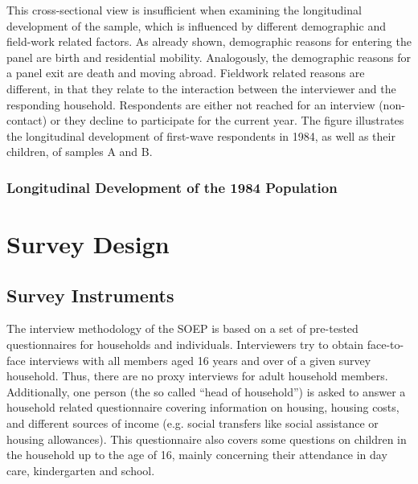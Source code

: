 \documentclass[letterpaper,10pt,openany,onesideH,english]{sphinxmanual}
\begin{document}

This cross-sectional view is insufficient when examining the longitudinal development of the sample, which is influenced by different demographic and field-work related factors. As already shown, demographic reasons for entering the panel are birth and residential mobility. Analogously, the demographic reasons for a panel exit are death and moving abroad. Fieldwork related reasons are different, in that they relate to the interaction between the interviewer and the responding household. Respondents are either not reached for an interview (non-contact) or they decline to participate for the current year. The figure illustrates the longitudinal development of first-wave respondents in 1984, as well as their children, of samples A and B.


\subsection{Longitudinal Development of the 1984 Population}
\label{\detokenize{Target Population and Samples/index:longitudinal-development-of-the-1984-population}}
\begin{figure}[H]
\centering

\noindent{}
\end{figure}



\chapter{Survey Design}
\label{\detokenize{Survey Design/index:survey-design}}\label{\detokenize{Survey Design/index::doc}}

\section{Survey Instruments}
\label{\detokenize{Survey Design/index:survey-instruments}}
The interview methodology of the SOEP is based on a set of pre-tested questionnaires for households and individuals. Interviewers try to obtain face-to-face interviews with all members aged 16 years and over of a given survey household. Thus, there are no proxy interviews for adult household members. Additionally, one person (the so called “head of household”) is asked to answer a household related questionnaire covering information on housing, housing costs, and different sources of income (e.g. social transfers like social assistance or housing allowances). This questionnaire also covers some questions on children in the household up to the age of 16, mainly concerning their attendance in day care, kindergarten and school.
\end{document}
